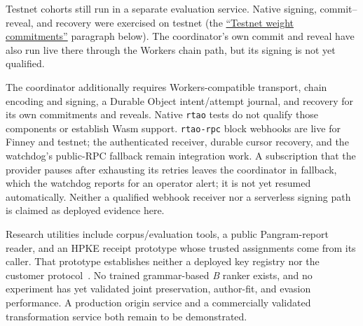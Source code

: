 Testnet cohorts still run in a separate evaluation service. Native signing,
commit--reveal, and recovery were exercised on testnet
(the \hyperref[testnet-m2]{``Testnet weight commitments''} paragraph below). The
coordinator's own commit and reveal have also run live there through the
Workers chain path, but its signing is not yet qualified.

The coordinator additionally requires Workers-compatible transport, chain
encoding and signing, a Durable Object intent/attempt journal, and recovery for
its own commitments and reveals. Native \texttt{rtao} tests do not qualify those
components or establish Wasm support. \texttt{rtao-rpc} block webhooks are live
for Finney and testnet; the authenticated receiver, durable cursor recovery, and
the watchdog's public-RPC fallback remain integration work. A subscription that
the provider pauses after exhausting its retries leaves the coordinator in
fallback, which the watchdog reports for an operator alert; it is not yet
resumed automatically. Neither a qualified webhook receiver
nor a serverless signing path is claimed as deployed evidence here.

Research utilities include corpus/evaluation tools, a public Pangram-report
reader, and an HPKE receipt prototype whose trusted assignments come from its
caller. That prototype establishes neither a deployed key registry nor the
customer protocol~\cite{receipts}. No trained grammar-based \textit{B}
ranker exists, and no experiment has yet validated joint preservation,
author-fit, and evasion performance. A production origin service and a commercially validated
transformation service both remain to be demonstrated.

